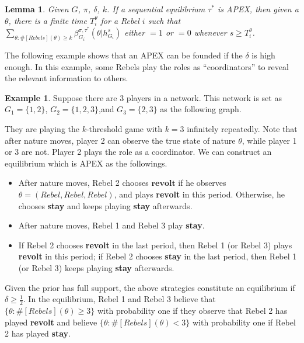 \documentclass[12pt,letter]{article}
\newtheorem{lemma}{Lemma}[section]
\theoremstyle{definition}
\newtheorem{example}{Example}[section]
\theoremstyle{remark}
\theoremstyle{claim}
\begin{document}
\begin{lemma}\label{lemma_learn}
Given $G$, $\pi$, $\delta$, $k$. If a sequential equilibrium $\tau^*$ is APEX, then given a $\theta$, there is a finite time $T^{\theta}_i$ for a Rebel $i$ such that $\sum_{\theta:\#[Rebels](\theta)\geq k}\beta^{\pi,\tau^*}_{G_i}(\theta|h^{s}_{G_i})$ either $=1$ or $=0$
whenever $s\geq T^{\theta}_i$.
\end{lemma}


The following example shows that an APEX can be founded if the $\delta$ is high enough. In this example, some Rebels play the roles as ``coordinators'' to reveal the relevant information to others.
\begin{example}\label{ex_leading_ex}
Suppose there are 3 players in a network.  This network is set as $G_1=\{1,2\}$, $G_2=\{1,2,3\}$,and $G_3=\{2,3\}$ as the following graph.

\begin{center}
\end{center}

They are playing the $k$-threshold game with $k=3$ infinitely repeatedly. Note that after nature moves, player 2 can observe the true state of nature $\theta$, while player 1 or 3 are not. Player 2 plays the role as a coordinator. We can construct an equilibrium which is APEX as the followings. 

\begin{itemize}
\item After nature moves, Rebel 2 chooses $\textbf{revolt}$ if he observes $\theta=(Rebel,Rebel,Rebel)$, and plays \textbf{revolt} in this period. Otherwise, he chooses \textbf{stay} and keeps playing \textbf{stay} afterwards. 
\item After nature moves, Rebel 1 and Rebel 3 play \textbf{stay}.
\item If Rebel 2 chooses \textbf{revolt} in the last period, then Rebel 1 (or Rebel 3) plays \textbf{revolt} in this period; if Rebel 2 chooses \textbf{stay} in the last period, then Rebel 1 (or Rebel 3) keeps playing \textbf{stay} afterwards. 
\end{itemize}

Given the prior has full support, the above strategies constitute an equilibrium if $\delta\geq \frac{1}{2}$. In the equilibrium, Rebel 1 and Rebel 3 believe that $\{\theta:\#[Rebels](\theta)\geq 3\}$ with probability one if they observe that Rebel 2 has played \textbf{revolt} and believe $\{\theta:\#[Rebels](\theta)< 3\}$ with probability one if Rebel 2 has played \textbf{stay}.
\end{example}
\end{document}
